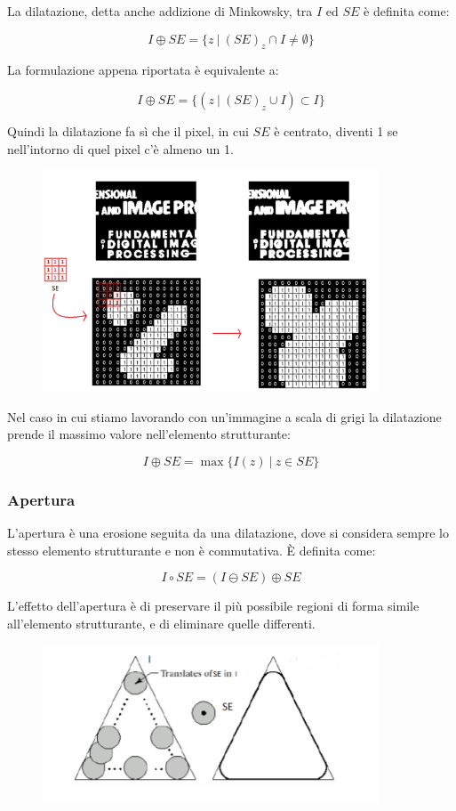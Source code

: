 La dilatazione, detta anche addizione di Minkowsky, tra $I$ ed $SE$ è
definita come:

$$
    I \oplus SE = \{z \ | \ (SE)_z \cap I \neq \emptyset\}
$$

La formulazione appena riportata è equivalente a:

$$
    I \oplus SE = \{(z \ | \ (SE)_z \cup I) \subset I\}
$$

Quindi la dilatazione fa sì
che il pixel, in cui $SE$ è centrato, diventi 1 se nell'intorno di quel pixel
c'è almeno un 1.

\begin{figure}[H]
    \centering
    \includegraphics[width=10cm, keepaspectratio]{capitoli/immagini/imgs/dilatazione-esempio.png}
\end{figure}

Nel caso in cui stiamo lavorando con un'immagine a scala di grigi
la dilatazione prende il massimo valore nell'elemento strutturante:

$$
    I \oplus SE = \max\{I(z) \ | \ z \in SE\}
$$

\subsubsection{Apertura}
L'apertura è una erosione seguita da una dilatazione, dove si considera sempre lo stesso elemento strutturante e non è commutativa.
È definita come:

$$
    I \circ SE = (I \ominus SE) \oplus SE
$$

L'effetto dell'apertura è di preservare il più possibile regioni di forma simile all'elemento strutturante, e di eliminare quelle
differenti.

\begin{figure}[H]
    \centering
    \includegraphics[width=10cm, keepaspectratio]{capitoli/immagini/imgs/apertura.png}
\end{figure}

